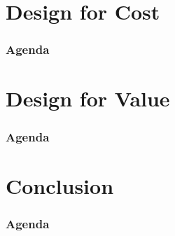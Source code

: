 \section{Design for Cost}
\begin{frame}
	\frametitle{Agenda}
\end{frame}



\section{Design for Value}
\begin{frame}
	\frametitle{Agenda}
\end{frame}



\section{Conclusion}
\begin{frame}
	\frametitle{Agenda}
\end{frame}






